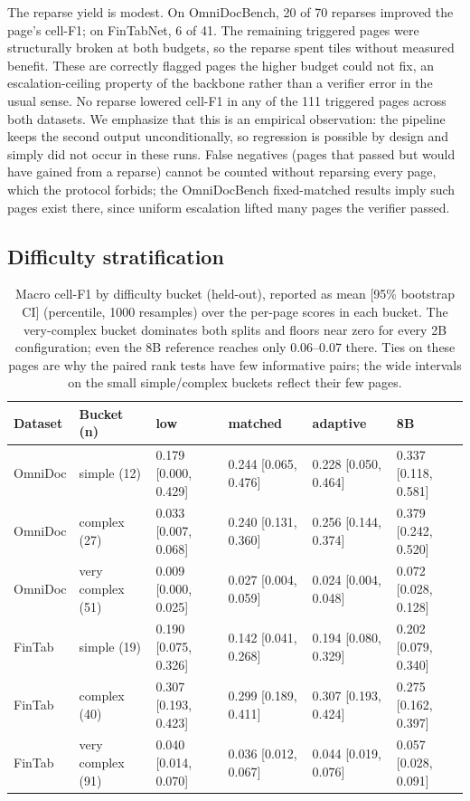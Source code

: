 \documentclass[conference]{IEEEtran}
\begin{document}
The reparse yield is modest. On OmniDocBench,
20 of 70 reparses improved the page's cell-F1; on FinTabNet, 6 of 41. The
remaining triggered pages were structurally broken at both budgets, so
the reparse spent tiles without measured benefit. These are correctly
flagged pages the higher budget could not fix, an escalation-ceiling
property of the backbone rather than a verifier error in the usual sense.
No reparse lowered cell-F1 in any of the 111 triggered pages across both
datasets. We emphasize that this is an empirical observation: the
pipeline keeps the second output unconditionally, so regression is
possible by design and simply did not occur in these runs. False
negatives (pages that passed but would have gained from a reparse) cannot
be counted without reparsing every page, which the protocol forbids; the
OmniDocBench fixed-matched results imply such pages exist there, since
uniform escalation lifted many pages the verifier passed.

\subsection{Difficulty stratification}
\label{sec:buckets}

\begin{table}[t]
  \centering
  \caption{Macro cell-F1 by difficulty bucket (held-out), reported as
  mean [95\% bootstrap CI] (percentile, 1000 resamples) over the per-page
  scores in each bucket. The very-complex bucket dominates both splits and
  floors near zero for every 2B configuration; even the 8B reference
  reaches only 0.06--0.07 there. Ties on these pages are why the paired
  rank tests have few informative pairs; the wide intervals on the small
  simple/complex buckets reflect their few pages.}
  \label{tab:buckets}
  \footnotesize
  \setlength{\tabcolsep}{5pt}
  \begin{tabular}{llllll}
  \toprule
  Dataset & Bucket (n) & low & matched & adaptive & 8B \\
  \midrule
  OmniDoc & simple (12) & 0.179 [0.000, 0.429] & 0.244 [0.065, 0.476] & 0.228 [0.050, 0.464] & 0.337 [0.118, 0.581] \\
  OmniDoc & complex (27) & 0.033 [0.007, 0.068] & 0.240 [0.131, 0.360] & 0.256 [0.144, 0.374] & 0.379 [0.242, 0.520] \\
  OmniDoc & very complex (51) & 0.009 [0.000, 0.025] & 0.027 [0.004, 0.059] & 0.024 [0.004, 0.048] & 0.072 [0.028, 0.128] \\
  FinTab  & simple (19) & 0.190 [0.075, 0.326] & 0.142 [0.041, 0.268] & 0.194 [0.080, 0.329] & 0.202 [0.079, 0.340] \\
  FinTab  & complex (40) & 0.307 [0.193, 0.423] & 0.299 [0.189, 0.411] & 0.307 [0.193, 0.424] & 0.275 [0.162, 0.397] \\
  FinTab  & very complex (91) & 0.040 [0.014, 0.070] & 0.036 [0.012, 0.067] & 0.044 [0.019, 0.076] & 0.057 [0.028, 0.091] \\
  \bottomrule
  \end{tabular}
\end{table}
\end{document}

